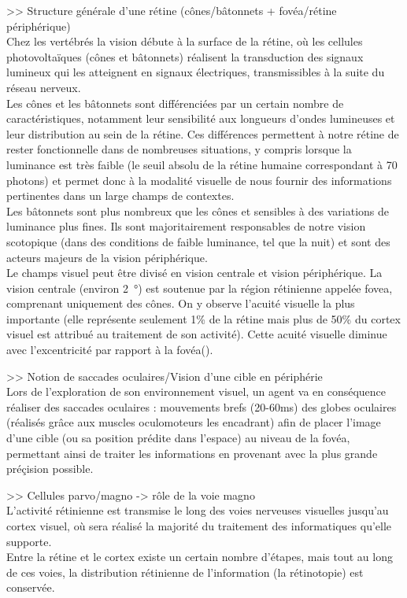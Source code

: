 >> Structure générale d'une rétine (cônes/bâtonnets + fovéa/rétine périphérique)\\
Chez les vertébrés la vision débute à la surface de la rétine, où les cellules photovoltaïques (cônes et bâtonnets) réalisent la transduction des signaux lumineux qui les atteignent en signaux électriques, transmissibles à la suite du réseau nerveux.\\
Les cônes et les bâtonnets sont différenciées par un certain nombre de caractéristiques, notamment leur sensibilité aux longueurs d'ondes lumineuses et leur distribution au sein de la rétine. Ces différences permettent à notre rétine de rester fonctionnelle dans de nombreuses situations, y compris lorsque la luminance est très faible (le seuil absolu de la rétine humaine correspondant à 70 photons) et permet donc à la modalité visuelle de nous fournir des informations pertinentes dans un large champs de contextes.\\
Les bâtonnets sont plus nombreux que les cônes et sensibles à des variations de luminance plus fines. Ils sont majoritairement responsables de notre vision scotopique (dans des conditions de faible luminance, tel que la nuit) et sont des acteurs majeurs de la vision périphérique.\\
Le champs visuel peut être divisé en vision centrale et vision périphérique. La vision centrale (environ \SI{2}{\degree}) est soutenue par la région rétinienne appelée fovea, comprenant uniquement des cônes. On y observe l'acuité visuelle la plus importante (elle représente seulement 1\% de la rétine mais plus de 50\% du cortex visuel est attribué au traitement de son activité). Cette acuité visuelle diminue avec l'excentricité par rapport à la fovéa(\cite{Werner2014}).

>> Notion de saccades oculaires/Vision d'une cible en périphérie\\
Lors de l'exploration de son environnement visuel, un agent va en conséquence réaliser des saccades oculaires : mouvements brefs (20-60\si{\milli\second}) des globes oculaires (réalisés grâce aux muscles oculomoteurs les encadrant) afin de placer l'image d'une cible (ou sa position prédite dans l'espace) au niveau de la fovéa, permettant ainsi de traiter les informations en provenant avec la plus grande préçision possible.

>> Cellules parvo/magno -> rôle de la voie magno\\
L'activité rétinienne est transmise le long des voies nerveuses visuelles jusqu'au cortex visuel, où sera réalisé la majorité du traitement des informatiques qu'elle supporte. \\
Entre la rétine et le cortex existe un certain nombre d'étapes, mais tout au long de ces voies, la distribution rétinienne de l'information  (la rétinotopie) est conservée. 

